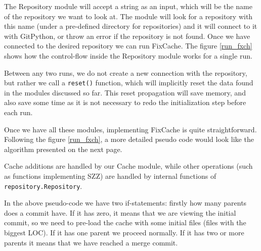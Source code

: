 \documentclass[12pt,twoside,notitlepage]{report}
\newcommand{\fxch}{FixCache}
\begin{document}
The Repository module will accept a string as an input, which will be the name of the repository we want to look at. The module will look for a repository with this name (under a pre-defined directory for repositories) and it will connect to it with GitPython, or throw an error if the repository is not found. Once we have connected to the desired repository we can run \fxch{}. The figure \ref{run_fxch} shows how the control-flow inside the Repository module works for a single run.

Between any two runs, we do not create a new connection with the repository, but rather we call a \texttt{reset()} function, which will implicitly reset the data found in the modules discussed so far. This reset propagation will save memory, and also save some time as it is not necessary to redo the initialization step before each run.

Once we have all these modules, implementing \fxch{} is quite straightforward. Following the figure \ref{run_fxch}, a more detailed pseudo code would look like the algorithm presented on the next page.
\clearpage
\begin{algorithm}[H]
\caption{\fxch{}}
\label{fxch_psd}
\end{algorithm}
\vspace{1em}
Cache additions are handled by our Cache module, while other operations (such as functions implementing SZZ) are handled by internal functions of \texttt{repository.Repository}.

In the above pseudo-code we have two if-statements: firstly how many parents does a commit have. If it has zero, it means that we are viewing the initial commit, so we need to pre-load the cache with some initial files (files with the biggest LOC). If it has one parent we proceed normally. If it has two or more parents it means that we have reached a merge commit.
\end{document}
